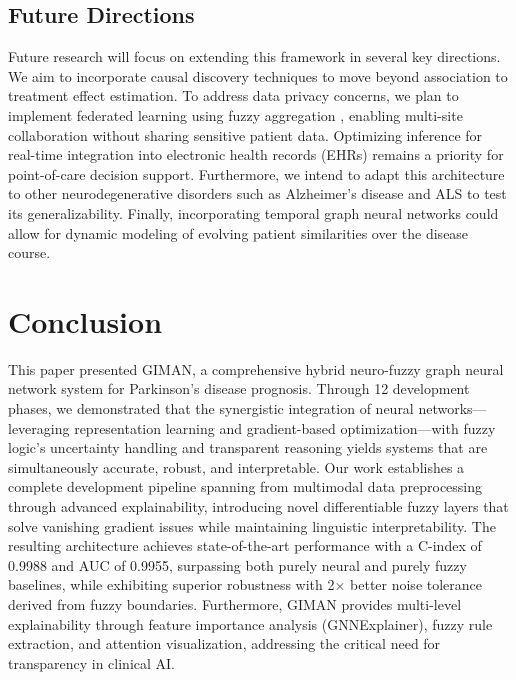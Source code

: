 \documentclass[conference]{IEEEtran}
\begin{document}
\subsection{Future Directions}

Future research will focus on extending this framework in several key directions. We aim to incorporate causal discovery techniques \cite{peters2017elements} to move beyond association to treatment effect estimation. To address data privacy concerns, we plan to implement federated learning using fuzzy aggregation \cite{kairouz2019advances}, enabling multi-site collaboration without sharing sensitive patient data. Optimizing inference for real-time integration into electronic health records (EHRs) remains a priority for point-of-care decision support. Furthermore, we intend to adapt this architecture to other neurodegenerative disorders such as Alzheimer's disease and ALS to test its generalizability. Finally, incorporating temporal graph neural networks \cite{kazemi2020representation} could allow for dynamic modeling of evolving patient similarities over the disease course.

\section{Conclusion}

This paper presented GIMAN, a comprehensive hybrid neuro-fuzzy graph neural network system for Parkinson's disease prognosis. Through 12 development phases, we demonstrated that the synergistic integration of neural networks—leveraging representation learning and gradient-based optimization—with fuzzy logic's uncertainty handling and transparent reasoning yields systems that are simultaneously accurate, robust, and interpretable. Our work establishes a complete development pipeline spanning from multimodal data preprocessing through advanced explainability, introducing novel differentiable fuzzy layers that solve vanishing gradient issues while maintaining linguistic interpretability. The resulting architecture achieves state-of-the-art performance with a C-index of 0.9988 and AUC of 0.9955, surpassing both purely neural and purely fuzzy baselines, while exhibiting superior robustness with 2× better noise tolerance derived from fuzzy boundaries. Furthermore, GIMAN provides multi-level explainability through feature importance analysis (GNNExplainer), fuzzy rule extraction, and attention visualization, addressing the critical need for transparency in clinical AI.
\end{document}
